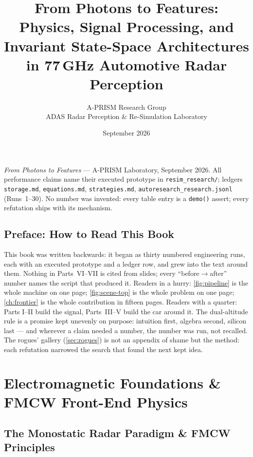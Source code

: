 \documentclass[11pt,oneside]{book}
\title{From Photons to Features:\\Physics, Signal Processing, and Invariant State-Space Architectures\\in 77\,GHz Automotive Radar Perception}
\author{A-PRISM Research Group\\ADAS Radar Perception \& Re-Simulation Laboratory}
\date{September 2026}
\begin{document}
\maketitle
\thispagestyle{empty}
\null\vfill
\noindent\textit{From Photons to Features} --- A-PRISM Laboratory, September 2026.
All performance claims name their executed prototype in \texttt{resim\_research/};
ledgers \texttt{storage.md}, \texttt{equations.md}, \texttt{strategies.md},
\texttt{autoresearch\_research.jsonl} (Runs~1--30). No number was invented:
every table entry is a \texttt{demo()} assert; every refutation ships with
its mechanism.
\clearpage
\tableofcontents
\listoffigures
\listoftables
\listofalgorithms

\chapter*{Preface: How to Read This Book}
\label{ch:preface}

This book was written backwards: it began as thirty numbered engineering
runs, each with an executed prototype and a ledger row, and grew into the
text around them. Nothing in Parts~VI--VII is cited from slides; every
``before$\to$after'' number names the script that produced it. Readers in a
hurry: \cref{fig:pipeline} is the whole machine on one page;
\cref{fig:scene-top} is the whole problem on one page; \cref{ch:frontier}
is the whole contribution in fifteen pages. Readers with a quarter: Parts
I--II build the signal, Parts~III--V build the car around it. The
dual-altitude rule is a promise kept unevenly on purpose: intuition first,
algebra second, silicon last --- and wherever a claim needed a number, the
number was run, not recalled. The rogues' gallery (\cref{sec:rogues}) is
not an appendix of shame but the method: each refutation narrowed the
search that found the next kept idea.

\part{Electromagnetic Foundations \& FMCW Front-End Physics}

\chapter{The Monostatic Radar Paradigm \& FMCW Principles}
\label{ch:fmcw}
\end{document}
